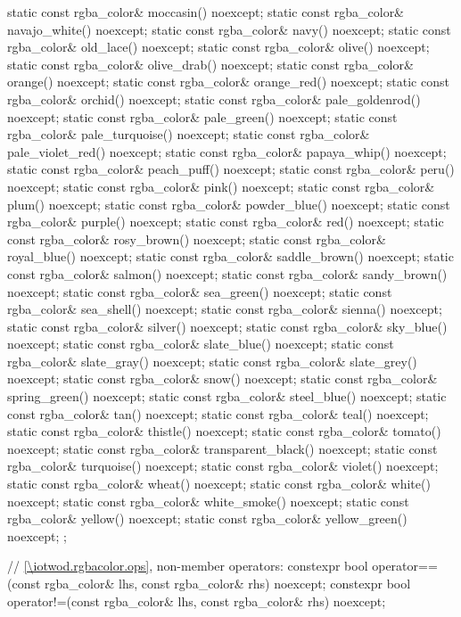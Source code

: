 \begin{codeblock}
{{    static const rgba_color& moccasin() noexcept;
    static const rgba_color& navajo_white() noexcept;
    static const rgba_color& navy() noexcept;
    static const rgba_color& old_lace() noexcept;
    static const rgba_color& olive() noexcept;
    static const rgba_color& olive_drab() noexcept;
    static const rgba_color& orange() noexcept;
    static const rgba_color& orange_red() noexcept;
    static const rgba_color& orchid() noexcept;
    static const rgba_color& pale_goldenrod() noexcept;
    static const rgba_color& pale_green() noexcept;
    static const rgba_color& pale_turquoise() noexcept;
    static const rgba_color& pale_violet_red() noexcept;
    static const rgba_color& papaya_whip() noexcept;
    static const rgba_color& peach_puff() noexcept;
    static const rgba_color& peru() noexcept;
    static const rgba_color& pink() noexcept;
    static const rgba_color& plum() noexcept;
    static const rgba_color& powder_blue() noexcept;
    static const rgba_color& purple() noexcept;
    static const rgba_color& red() noexcept;
    static const rgba_color& rosy_brown() noexcept;
    static const rgba_color& royal_blue() noexcept;
    static const rgba_color& saddle_brown() noexcept;
    static const rgba_color& salmon() noexcept;
    static const rgba_color& sandy_brown() noexcept;
    static const rgba_color& sea_green() noexcept;
    static const rgba_color& sea_shell() noexcept;
    static const rgba_color& sienna() noexcept;
    static const rgba_color& silver() noexcept;
    static const rgba_color& sky_blue() noexcept;
    static const rgba_color& slate_blue() noexcept;
    static const rgba_color& slate_gray() noexcept;
    static const rgba_color& slate_grey() noexcept;
    static const rgba_color& snow() noexcept;
    static const rgba_color& spring_green() noexcept;
    static const rgba_color& steel_blue() noexcept;
    static const rgba_color& tan() noexcept;
    static const rgba_color& teal() noexcept;
    static const rgba_color& thistle() noexcept;
    static const rgba_color& tomato() noexcept;
    static const rgba_color& transparent_black() noexcept;
    static const rgba_color& turquoise() noexcept;
    static const rgba_color& violet() noexcept;
    static const rgba_color& wheat() noexcept;
    static const rgba_color& white() noexcept;
    static const rgba_color& white_smoke() noexcept;
    static const rgba_color& yellow() noexcept;
    static const rgba_color& yellow_green() noexcept;
  };

  // \ref{\iotwod.rgbacolor.ops}, non-member operators:
  constexpr bool operator==(const rgba_color& lhs, const rgba_color& rhs) 
    noexcept;
  constexpr bool operator!=(const rgba_color& lhs, const rgba_color& rhs) 
    noexcept;
}
\end{codeblock}

